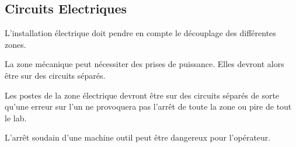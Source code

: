 \subsection{Circuits Electriques}

L'installation électrique doit pendre en compte le découplage des différentes zones.

La zone mécanique peut nécessiter des prises de puissance. Elles devront alors être sur des circuits séparés.

Les postes de la zone électrique devront être sur des circuits séparés de sorte qu'une erreur sur l'un ne provoquera pas
l'arrêt de toute la zone ou pire de tout le lab.

L'arrêt soudain d'une machine outil peut être dangereux pour l'opérateur.

